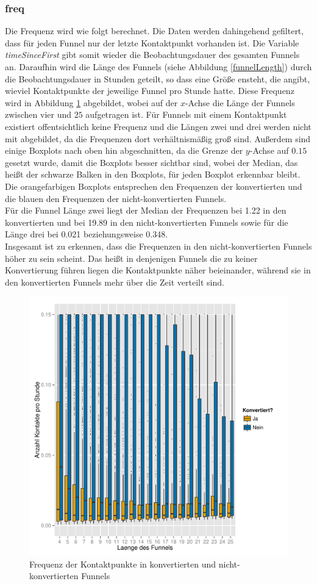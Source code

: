 \subsubsection*{freq}
Die Frequenz wird wie folgt berechnet. Die Daten werden dahingehend gefiltert, dass für jeden Funnel nur der letzte Kontaktpunkt vorhanden ist. Die Variable \textit{timeSinceFirst} gibt somit wieder die Beobachtungsdauer des gesamten Funnels an. Daraufhin wird die Länge des Funnels (siehe Abbildung \ref{funnelLength}) durch die Beobachtungsdauer in Stunden geteilt, so dass eine Größe ensteht, die angibt, wieviel Kontaktpunkte der jeweilige Funnel pro Stunde hatte. Diese Frequenz wird in Abbildung \ref{freq} abgebildet, wobei auf der $x$-Achse die Länge der Funnels zwischen vier und $25$ aufgetragen ist. Für Funnels mit einem Kontaktpunkt existiert offentsichtlich keine Frequenz und die Längen zwei und drei werden nicht mit abgebildet, da die Frequenzen dort verhältnismäßig groß sind. Außerdem sind einige Boxplots nach oben hin abgeschnitten, da die Grenze der $y$-Achse auf $0.15$ gesetzt wurde, damit die Boxplots besser sichtbar sind, wobei der Median, das heißt der schwarze Balken in den Boxplots, für jeden Boxplot erkennbar bleibt. Die orangefarbigen Boxplots entsprechen den Frequenzen der konvertierten und die blauen den Frequenzen der nicht-konvertierten Funnels.\\
Für die Funnel Länge zwei liegt der Median der Frequenzen bei 1.22 in den konvertierten und bei 19.89 in den nicht-konvertierten Funnels sowie für die Länge drei bei 0.021 beziehungsweise 0.348.\\
Insgesamt ist zu erkennen, dass die Frequenzen in den nicht-konvertierten Funnels höher zu sein scheint. Das heißt in denjenigen Funnels die zu keiner Konvertierung führen liegen die Kontaktpunkte näher beieinander, während sie in den konvertierten Funnels mehr über die Zeit verteilt sind.\\
\begin{figure}[H]
		\centering
	\includegraphics[scale=0.5]{freq.pdf}
	\caption[Frequenz der Kontaktpunkte]{Frequenz der Kontaktpunkte in konvertierten und nicht-konvertierten Funnels}
	\label{freq}
\end{figure}
